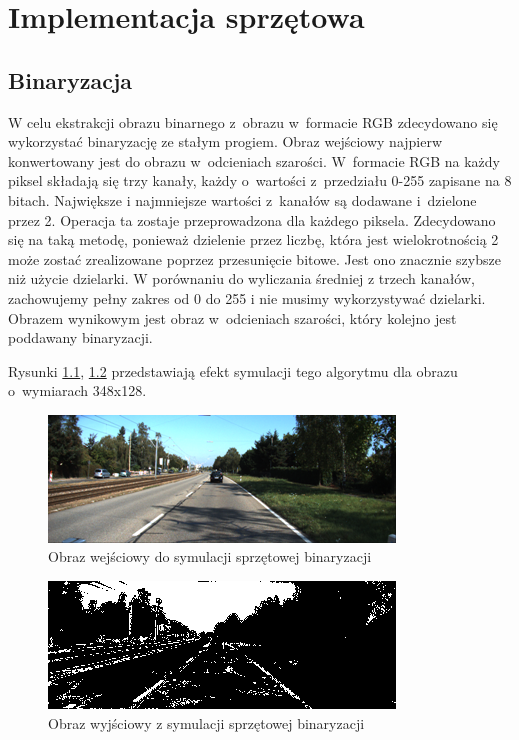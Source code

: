 \chapter{Implementacja sprzętowa}

\section{Binaryzacja}

W celu ekstrakcji obrazu binarnego z~obrazu w~formacie RGB zdecydowano się wykorzystać binaryzację ze stałym progiem. 
Obraz wejściowy najpierw konwertowany jest do obrazu w~odcieniach szarości. 
W~formacie RGB na każdy piksel składają się trzy kanały, każdy o~wartości z~przedziału 0-255 zapisane na 8 bitach. 
Największe i najmniejsze wartości z~kanałów są dodawane i~dzielone przez 2. 
Operacja ta zostaje przeprowadzona dla każdego piksela.
Zdecydowano się na taką metodę, ponieważ dzielenie przez liczbę, która jest wielokrotnością 2 może zostać zrealizowane poprzez przesunięcie bitowe. Jest ono znacznie szybsze niż użycie dzielarki. W porównaniu do wyliczania średniej z trzech kanałów, zachowujemy pełny zakres od 0 do 255 i nie musimy wykorzystywać dzielarki.
Obrazem wynikowym jest obraz w~odcieniach szarości, który kolejno jest poddawany binaryzacji.

\noindent Rysunki \ref{fig:in_otsu_fpga}, \ref{fig:out_otsu_fpga} przedstawiają efekt symulacji tego algorytmu dla obrazu o~wymiarach 348x128. 

\begin{figure}[h]
		\centering
		\includegraphics[scale=0.8]{obraz_color_smal.png}
		\caption{Obraz wejściowy do symulacji sprzętowej binaryzacji}
		\label{fig:in_otsu_fpga}
\end{figure}

\begin{figure}[h]
		\centering
		\includegraphics[scale=0.8]{obraz_bin_smal.png}
		\caption{Obraz wyjściowy z symulacji sprzętowej binaryzacji}
		\label{fig:out_otsu_fpga}
\end{figure}

